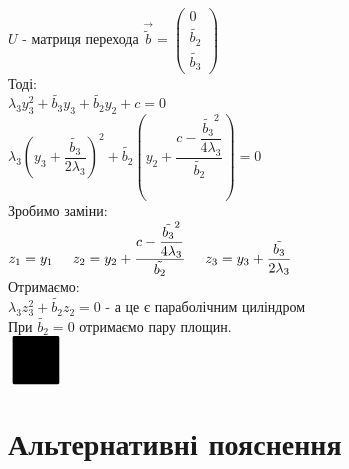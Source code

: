 \documentclass[a4paper, 10pt]{article}
\theoremstyle{theoremdd}
\theoremstyle{theoremdd}
\theoremstyle{theoremdd}
\theoremstyle{theoremdd}
\theoremstyle{theoremdd}
\theoremstyle{theoremdd}
\theoremstyle{theoremdd}
\theoremstyle{theoremdd}
\begin{document}
$U$ - матриця перехода $\vec{\tilde{b}} = \begin{pmatrix}
0 \\ \tilde{b_2} \\ \tilde{b_3}
\end{pmatrix}$\\
Тоді:\\
$\lambda_3 y_3^2 + \tilde{b_3} y_3 + \tilde{b_2} y_2 + c = 0$\\
$\lambda_3 \left(y_3 + \dfrac{\tilde{b_3}}{2 \lambda_3} \right)^2 + \tilde{b_2} \left(y_2 + \dfrac{c - \dfrac{\tilde{b_3}^2}{4\lambda_3}}{\tilde{b_2}} \right) = 0$\\
Зробимо заміни:\\
$z_1 = y_1 \hspace{0.5cm}
z_2 = y_2 + \dfrac{c - \dfrac{\tilde{b_3}^2}{4\lambda_3}}{\tilde{b_2}} \hspace{0.5cm}
z_3 = y_3 + \dfrac{\tilde{b_3}}{2 \lambda_3}
$\\
Отримаємо:\\
$\lambda_3 z_3^2 + \tilde{b_2} z_2 = 0$ - а це є параболічним циліндром\\
При $\tilde{b_2} = 0$ отримаємо пару площин.\\
$\scaleobj{5}{\blacksquare}$
\newpage

\iffalse
\section{Альтернативні пояснення}
\end{document}
